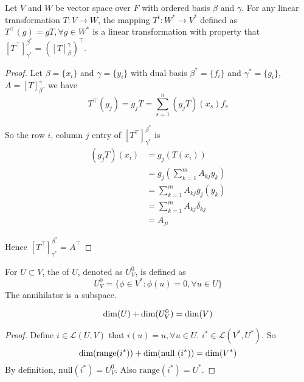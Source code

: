 \begin{theorem}
	Let $V$ and $W$ be vector space over $F$ with ordered basis $\beta$ and $\gamma$. For any linear transformation $T:V \rightarrow W$, the mapping $T^t: W^* \rightarrow V^*$ defined as $T^\top (g) = gT, \forall g \in W^*$ is a linear transformation with property that $[T^\top]_{\gamma^*}^{\beta^*} = ([T]_\beta^\gamma)^\top$.
\end{theorem}
\begin{proof}
	Let $\beta = \{x_i\}$ and $\gamma=\{y_i\}$ with dual basis $\beta^*=\{f_i\}$ and $\gamma^*=\{g_i\}$, $A=[T]_\beta^\gamma$. we have
	\begin{equation*}
		T^\top (g_j) = g_j T = \sum_{s=1}^n (g_j T) (x_s) f_s
	\end{equation*}
	
	So the row $i$, column $j$ entry of $[T^\top]_{\gamma^*}^{\beta^*}$ is
	\begin{equation*}
		\begin{aligned}
			(g_j T)(x_i) &= g_j (T(x_i)) \\
			&= g_j \left( \sum_{k=1}^m A_{kj} y_k \right) \\
			&= \sum_{k=1}^m A_{kj} g_j(y_k) \\
			&= \sum_{k=1}^m A_{kj} \delta_{kj} \\
			&= A_{ji}
		\end{aligned}
	\end{equation*}
	
	Hence $[T^\top]_{\gamma^*}^{\beta^*} = A^\top $
\end{proof}

\begin{definition}
    For $U \subset V$, the  of $U$, denoted as $U^0_V$, is defined as
    \begin{equation*}
        U^0_V = \{ \phi \in V^*: \phi(u) = 0, \forall u \in U \}
    \end{equation*}
    The annihilator is a subspace.
\end{definition}

\begin{theorem}
    \begin{equation}
        \displaystyle \text{dim}( U ) + \text{dim}(U_V^0) = \text{dim}(V)
    \end{equation}
\end{theorem}

\begin{proof}
    Define $i \in \mathcal{L}(U,V)$ that $i(u) = u, \forall u \in U$. $i^* \in \mathcal{L}(V^*,U^*)$. So
    \begin{equation*}
        \displaystyle \text{dim}( \text{range}(i^*) ) + \text{dim}(\text{null } (i^*)) = \text{dim}(V^*)
    \end{equation*}
    By definition, $\text{null}(i^*) = U^0_V$. Also $\text{range}(i^*) = U^*$.
\end{proof}


